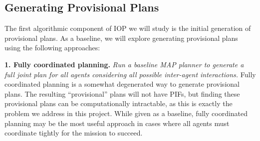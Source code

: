 \documentclass[11pt]{article}
\begin{document}
\subsection{Generating Provisional Plans}
\label{sec:generating}

The first algorithmic component of IOP we will study is the initial generation of provisional plans. As a baseline, we will explore generating provisional plans using the following approaches:

{\bf 1. Fully coordinated planning.} {\em Run a baseline MAP planner to generate a full joint plan for all agents considering all possible inter-agent interactions.} 
Fully coordinated planning is a somewhat degenerated way to generate provisional plans. The resulting ``provisional'' plans will not have PIFs, but finding these provisional plans can be computationally intractable, as this is exactly the problem we address in this project. While given as a baseline, fully coordinated planning may be 
the most useful approach in cases where all agents must coordinate tightly for the mission to succeed. 
\end{document}
